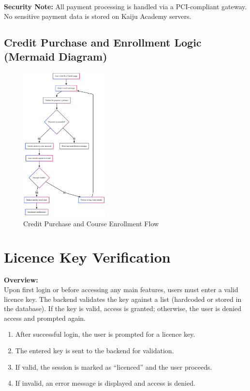 \documentclass[a4paper, 11pt]{scrreprt}
\begin{document}
\textbf{Security Note:} All payment processing is handled via a PCI-compliant gateway. No sensitive payment data is stored on Kaiju Academy servers.

\subsection{Credit Purchase and Enrollment Logic (Mermaid Diagram)}

\begin{figure}[ht]
    \centering
    \includegraphics[width=0.4\textwidth]{img/credit_purchase_flow.png}
    \caption{Credit Purchase and Course Enrollment Flow}
\end{figure}

\section{Licence Key Verification}

\textbf{Overview:} \\
Upon first login or before accessing any main features, users must enter a valid licence key. The backend validates the key against a list (hardcoded or stored in the database). If the key is valid, access is granted; otherwise, the user is denied access and prompted again.

\begin{enumerate}
    \item After successful login, the user is prompted for a licence key.
    \item The entered key is sent to the backend for validation.
    \item If valid, the session is marked as “licenced” and the user proceeds.
    \item If invalid, an error message is displayed and access is denied.
\end{enumerate}
\end{document}
